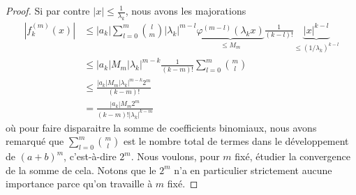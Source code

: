 \begin{proof}
    Si par contre \( | x |\leq\frac{1}{ \lambda_k }\), nous avons les majorations
    \begin{subequations}
        \begin{align}
        | f^{(m)}_k(x) |&\leq  |a_k|\sum_{l=0}^{m}\binom{ l }{ m }|\lambda_k|^{m-l}\underbrace{\varphi^{(m-l)}(\lambda_kx)}_{\leq M_m}\frac{ 1 }{ (k-l)! }\underbrace{| x |^{k-l}}_{\leq (1/\lambda_k)^{k-l}}\\
        &\leq | a_k |M_m| \lambda_k |^{m-k}\frac{1}{ (k-m)! }\sum_{l=0}^{m}\binom{ m }{ l }\\
        &\leq \frac{ | a_k |M_m | \lambda_k |^{m-k}2^m }{ (k-m)! }\\
        &= \frac{ | a_k |M_m 2^m }{ (k-m)!  | \lambda_k |^{k-m} }       \label{EqQSPUaun}
        \end{align}
    \end{subequations}
    où pour faire disparaitre la somme de coefficients binomiaux, nous avons remarqué que \( \sum_{l=0}^m\binom{ m }{ l }\) est le nombre total de termes dans le développement de \( (a+b)^m\), c'est-à-dire \( 2^m\). Nous voulons, pour \( m\) fixé, étudier la convergence de la somme de cela. Notons que le \( 2^m\) n'a en particulier strictement aucune importance parce qu'on travaille à \( m\) fixé.


\end{proof}
